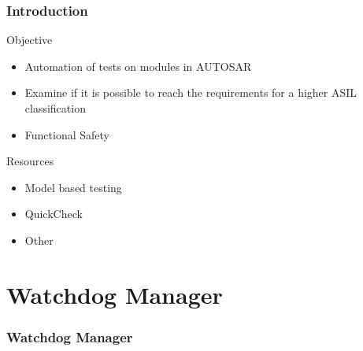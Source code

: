 \documentclass{beamer}
\begin{document}
\begin{frame}[fragile]
  \frametitle{Introduction}
  \begin{block}{Objective}
    \begin{itemize}
        \item Automation of tests on modules in AUTOSAR
        \item Examine if it is possible to reach the requirements for
          a higher ASIL classification
        \item Functional Safety
    \end{itemize}
   \end{block}
  \begin{block}{Resources}
    \begin{itemize}
        \item Model based testing
        \item QuickCheck
        \item Other
    \end{itemize}
  \end{block}
\end{frame}


\section{Watchdog Manager}

\begin{frame}
  \frametitle{Watchdog Manager}
\end{frame}
\end{document}
